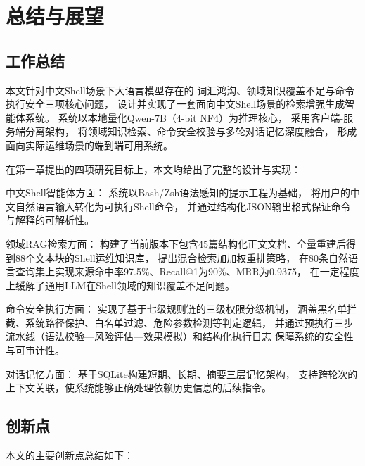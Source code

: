 \chapter{总结与展望}

\section{工作总结}

本文针对中文Shell场景下大语言模型存在的
词汇鸿沟、领域知识覆盖不足与命令执行安全三项核心问题，
设计并实现了一套面向中文Shell场景的检索增强生成智能体系统。
系统以本地量化Qwen-7B（4-bit NF4）为推理核心，
采用客户端-服务端分离架构，
将领域知识检索、命令安全校验与多轮对话记忆深度融合，
形成面向实际运维场景的端到端可用系统。

在第一章提出的四项研究目标上，本文均给出了完整的设计与实现：

中文Shell智能体方面：
系统以Bash/Zsh语法感知的提示工程为基础，
将用户的中文自然语言输入转化为可执行Shell命令，
并通过结构化JSON输出格式保证命令与解释的可解析性。

领域RAG检索方面：
构建了当前版本下包含45篇结构化正文文档、全量重建后得到88个文本块的Shell运维知识库，
提出混合检索加加权重排策略，
在80条自然语言查询集上实现来源命中率97.5\%、Recall@1为90\%、MRR为0.9375，
在一定程度上缓解了通用LLM在Shell领域的知识覆盖不足问题。

命令安全执行方面：
实现了基于七级规则链的三级权限分级机制，
涵盖黑名单拦截、系统路径保护、白名单过滤、危险参数检测等判定逻辑，
并通过预执行三步流水线（语法校验—风险评估—效果模拟）和结构化执行日志
保障系统的安全性与可审计性。

对话记忆方面：
基于SQLite构建短期、长期、摘要三层记忆架构，
支持跨轮次的上下文关联，使系统能够正确处理依赖历史信息的后续指令。

\section{创新点}

本文的主要创新点总结如下：

